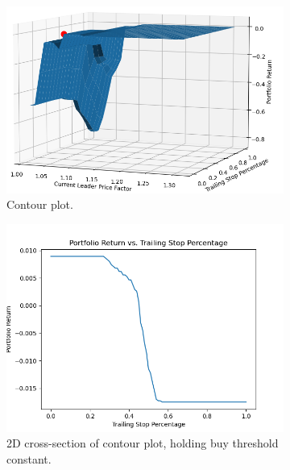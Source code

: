 \documentclass{article}
\begin{document}
\begin{figure}[H]
    \centering
    \begin{subfigure}{0.495\textwidth}
        \centering
        \includegraphics[width=\linewidth]{contourPlot.png}
        \caption{Contour plot.}
        \label{fig:contourPlot}
    \end{subfigure}
    \hfill
    \begin{subfigure}{0.495\textwidth}
        \centering
        \includegraphics[width=\linewidth]{slicePlot.png}
        \caption{2D cross-section of contour plot, holding buy threshold constant.}
        \label{fig:buyPlot}
    \end{subfigure}
    \label{fig:parameters}
    \begin{subfigure}{0.495\textwidth}
        \centering

\end{subfigure}
\end{figure}
\end{document}
